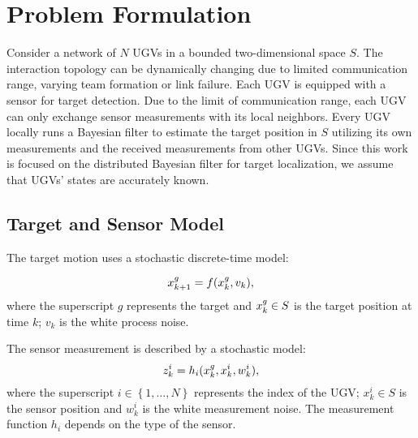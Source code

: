 \section{Problem Formulation}\label{sec:prob}
	Consider a network of $N$ UGVs in a bounded two-dimensional space $S$. 
	The interaction topology can be dynamically changing due to limited communication range, varying team formation or link failure.
	Each UGV is equipped with a sensor for target detection. 
	Due to the limit of communication range, each UGV can only exchange sensor measurements with its local neighbors. 
	Every UGV locally runs a Bayesian filter to estimate the target position in $S$ utilizing its own measurements and the received measurements from other UGVs. 
	Since this work is focused on the distributed Bayesian filter for target localization, we assume that UGVs' states are accurately known.
	
	\subsection{Target and Sensor Model}
	The target motion uses a stochastic discrete-time model: %
	
	\begin{equation}
		\small
		\label{eqn:tar_motion_model}
		\xg_{k+1}=f(\xg_k,v_k), %
	\end{equation}\normalsize
	where the superscript $g$ represents the target and $x^g_k\in S$ is the target position at time $k$;
	$v_k$ is the white process noise.
	
	The sensor measurement is described by a stochastic model:
	\begin{equation}\label{eqn:meas_model}
		z^i_k = h_i(x^g_k,x^i_k,w^i_k),
	\end{equation}
	where the superscript $i\in\left\lbrace 1,\dots,N\right\rbrace$ represents the index of the UGV; $x^i_k\in S$ is the sensor position and $w^i_k$ is the white measurement noise.
	The measurement function $h_i$ depends on the type of the sensor. 
	

